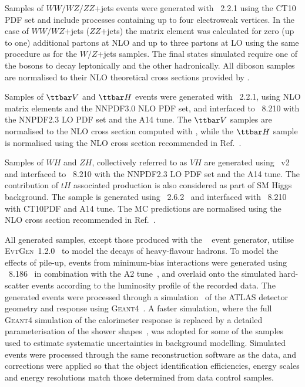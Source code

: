 \documentclass[PAPER, coverpage, atlasdraft=true, texlive=2016, UKenglish]{\ATLASLATEXPATH atlasdoc}
\begin{document}
Samples of $WW/WZ/ZZ$+jets events were generated with {\sherpa}~2.2.1 using the CT10 PDF set
and include processes containing up to four electroweak vertices. 
In the case of $WW/WZ$+jets ($ZZ$+jets) the matrix element was calculated for zero (up to one) additional partons 
at NLO and up to three partons at LO using the same procedure as for the $W/Z$+jets samples. 
The final states simulated require one of the bosons to decay leptonically and the other hadronically.
All diboson samples are normalised to their NLO theoretical cross sections provided by {\sherpa}. 

Samples of $\ttbar V$ and $\ttbar H$ events were generated with {\amcatnlo}~2.2.1, using NLO matrix elements and the NNPDF3.0 NLO PDF set,
and interfaced to {\pythia}~8.210 with the NNPDF2.3 LO PDF set and the A14 tune. 
The $\ttbar V$ samples are normalised to the NLO cross section computed with {\amcatnlo}, while the $\ttbar H$ sample is normalised using 
the NLO cross section recommended in Ref.~\cite{deFlorian:2016spz}.

Samples of $WH$ and $ZH$, collectively referred to as $VH$ are generated using {\powheg}~v2 \cite{Frixione:2007nw,Nason:2004rx,Frixione:2007vw,Alioli:2010xd}
and interfaced to {\pythia}~8.210 with the NNPDF2.3 LO PDF set and the A14 tune.
The contribution of $tH$ associated production is also considered as part of SM Higgs background.
The sample is generated using {\amcatnlolong}~2.6.2~\cite{Alwall:2014hca} and interfaced with {\pythia}~8.210 with CT10PDF
and A14 tune. The MC predictions are normalised using the NLO cross section recommended in Ref.~\cite{deFlorian:2016spz}. 

All generated samples, except those produced with the {\sherpa}~\cite{Gleisberg:2008ta} event generator, 
utilise \textsc{EvtGen}~1.2.0~\cite{Lange:2001uf} to model the decays of heavy-flavour hadrons. 
To model the effects of pile-up, events from minimum-bias interactions were generated using {\pythia}~8.186~\cite{Sjostrand:2007gs}  
in combination with the A2 tune~\cite{ATL-PHYS-PUB-2011-014}, 
and overlaid onto the simulated hard-scatter events according to the luminosity profile of the recorded data. 
The generated events were processed through a simulation~\cite{Aad:2010ah} of the ATLAS detector geometry and response 
using \textsc{Geant4}~\cite{Agostinelli:2002hh}. A faster simulation, where the full \textsc{Geant4} simulation of
the calorimeter response is replaced by a detailed parameterisation of the shower shapes~\cite{FastCaloSim},
was adopted for some of the samples used to estimate systematic uncertainties in background modelling.
Simulated events were processed through the same reconstruction software as the data, and corrections were applied so that the object identification 
efficiencies, energy scales and energy resolutions match those determined from data control samples.
\end{document}
